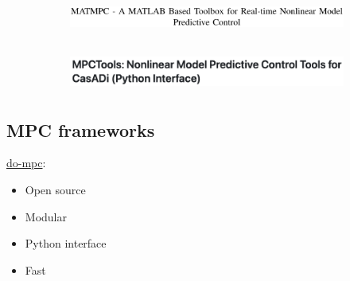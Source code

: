 \documentclass[
  letterpaper,
  DIV=11,
  numbers=noendperiod,
  oneside]{scrartcl}
\providecommand{\tightlist}{%
  \setlength{\itemsep}{0pt}\setlength{\parskip}{0pt}}\usepackage{longtable,booktabs,array}
\begin{document}
\begin{figure}
\begin{minipage}{0.50\linewidth}
\begin{figure}[H]

{\centering \includegraphics[width=\textwidth,height=0.52083in]{figs/package_matmpc.png}

}


\end{figure}%

\end{minipage}%
%
\begin{minipage}{0.50\linewidth}

\begin{figure}[H]

{\centering \includegraphics[width=\textwidth,height=0.52083in]{figs/package_mpctools.png}

}


\end{figure}%

\end{minipage}%

\end{figure}%

\subsection{MPC frameworks}\label{mpc-frameworks-1}

\href{https://www.do-mpc.com/en/latest/}{do-mpc}:

\begin{itemize}
\tightlist
\item
  Open source
\item
  Modular
\end{itemize}

\begin{itemize}
\tightlist
\item
  Python interface
\item
  Fast
\end{itemize}
\end{document}
